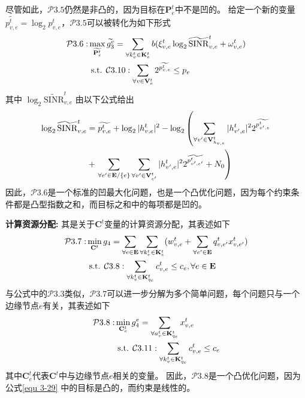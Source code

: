 尽管如此，$\mathcal{P}3.5$仍然是非凸的，因为目标在$\mathbf{P}_{e}^{t}$中不是凹的。
给定一个新的变量$\widetilde{p_{v, e}^t} = \log _{2} {p}_{v, e}^t$，$\mathcal{P}3.5$可以被转化为如下形式
\begin{align}
	\mathcal{P}3.6: & \max_{\widetilde{\mathbf{{P}}_{e}^{t}}}  \widetilde{g_3^{e}}= \sum_{\forall k_{v}^{t} \in \mathbf{K}_{e}^{t}} {b ( \xi_{v, e}^{t} \log _{2}\mathrm{\widetilde{SINR}}_{v, e}^t + \omega_{v, e}^{t} ) } \notag \\
	&\text { s.t. } \mathcal{C}3.10: \sum_{\forall v \in \mathbf{V}_{e}^{t}} 2^{\widetilde{p_{v, e}^t}} \leq p_{e}  
\end{align}
其中 $\log _{2}\mathrm{\widetilde{SINR}}_{v, e}^t$ 由以下公式给出
\begin{align}
	\log _{2}\mathrm{\widetilde{SINR}}_{v, e}^t &= \widetilde{p_{v, e}^t} + \log _{2} |h_{v, e}^t| ^{2} - \log _{2} \left( \sum\limits_{\forall v^{\prime} \in \mathbf{V}_{h_{v, e}}^{t}} |h_{v^{\prime}, e}^t|^2 2^{\widetilde{p_{v^{\prime}, e}^{t}}} \right. \notag \\
	&+ \left. \sum\limits_{\forall e^{\prime} \in \mathbf{E} / \{e\}} \sum\limits_{\forall v^{\prime} \in \mathbf{V}_{e^{\prime}}^{t}} |h_{v^{\prime}, e}^t|^2 2^{\widetilde{p_{v^{\prime}, e^{\prime}}^{t}}} + N_{0}\right)
\end{align}
\noindent 因此，$\mathcal{P}3.6$是一个标准的凹最大化问题，也是一个凸优化问题，因为每个约束条件都是凸型指数之和，而目标之和中的每项都是凹的。

\textbf{计算资源分配:} 其是关于$\mathbf{C}^{t}$变量的计算资源分配，其表述如下
\begin{align}
	\mathcal{P}3.7: &\min_{\mathbf{C}^{t}} g_4= \sum_{ \forall e \in \mathbf{E}} \sum_{\forall k_{v}^{t} \in \mathbf{K}_{e}^{t}} ( w_{v, e}^{t} + \sum_{\forall e^{\prime} \in \mathbf{E}} q_{v, e^{\prime}}^{t} x_{v, e^{\prime}}^t) \notag \\
	&\text { s.t. } \mathcal{C}3.8:  \sum_{\forall k_{v}^{t} \in {\mathbf{K}_{q_e}^{t} }} c_{v, e}^t \leq c_{e}, \forall e \in \mathbf{E}
\end{align}
与公式中的$\mathcal{P}3.3$类似，$\mathcal{P}3.7$可以进一步分解为多个简单问题，每个问题只与一个边缘节点$e$有关，其表述如下
\begin{align}
	\mathcal{P}3.8: &\min_{\mathbf{C}_{e}^{t}} g_4^e= \sum_{\forall a_{v}^{t} \in {\mathbf{K}_{q_e}^{t} }}   x_{v, e}^t \notag \\
	&\text { s.t. } \mathcal{C}3.11:  \sum_{\forall k_{v}^{t} \in {\mathbf{K}_{q_e}^{t} }} {c_{v, e}^t} \leq c_{e}
\label{equ 3-29}
\end{align}
\noindent 其中${\mathbf{C}_e^t}$代表${\mathbf{C}^{t}}$中与边缘节点$e$相关的变量。
因此，$\mathcal{P}3.8$是一个凸优化问题，因为公式\ref{equ 3-29} 中的目标是凸的，而约束是线性的。

